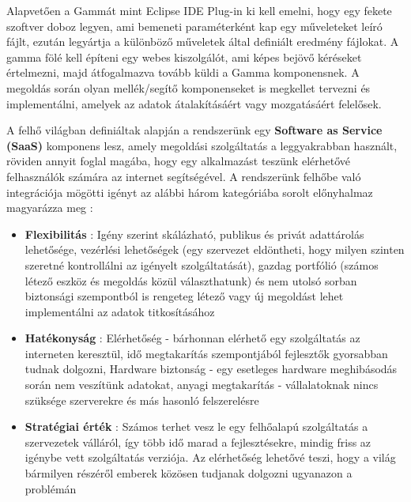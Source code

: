Alapvetően a Gammát mint Eclipse IDE Plug-in ki kell emelni, hogy egy fekete szoftver doboz legyen, ami bemeneti paraméterként kap egy műveleteket leíró fájlt, ezután legyártja a különböző műveletek által definiált eredmény fájlokat. A gamma fölé kell építeni egy webes kiszolgálót, ami képes bejövő kéréseket értelmezni, majd átfogalmazva tovább küldi a Gamma komponensnek. A megoldás során olyan mellék/segítő komponenseket is megkellet tervezni és implementálni, amelyek az adatok átalakításáért vagy mozgatásáért felelősek.


A felhő világban definiáltak alapján a rendszerünk egy \textbf{Software as Service (SaaS)} komponens lesz, amely megoldási szolgáltatás a leggyakrabban használt, röviden annyit foglal magába, hogy egy alkalmazást teszünk elérhetővé felhasználók számára az internet segítségével.
A rendszerünk felhőbe való integrációja mögötti igényt az alábbi három kategóriába sorolt előnyhalmaz magyarázza meg \cite{top10} \cite{ibm}:

 \begin{itemize}
	\item \textbf{Flexibilitás} : Igény szerint skálázható, publikus és privát adattárolás lehetősége, vezérlési lehetőségek (egy szervezet eldöntheti, hogy milyen szinten szeretné kontrollálni az igényelt szolgáltatását), gazdag portfólió (számos létező eszköz és megoldás közül választhatunk) és nem utolsó sorban biztonsági szempontból is rengeteg létező vagy új megoldást lehet implementálni az adatok titkosításához
	\item \textbf{Hatékonyság} : Elérhetőség - bárhonnan elérhető egy szolgáltatás az interneten keresztül, idő megtakarítás szempontjából fejlesztők gyorsabban tudnak dolgozni, Hardware biztonság - egy esetleges hardware meghibásodás során nem veszítünk adatokat, anyagi megtakarítás - vállalatoknak nincs szüksége szerverekre és más hasonló felszerelésre
	\item \textbf{Stratégiai érték} : Számos terhet vesz le egy felhőalapú szolgáltatás a szervezetek válláról, így több idő marad a fejlesztésekre, mindig friss az igénybe vett szolgáltatás verziója. Az elérhetőség lehetővé teszi, hogy a világ bármilyen részéről emberek közösen tudjanak dolgozni ugyanazon a problémán
\end{itemize}

